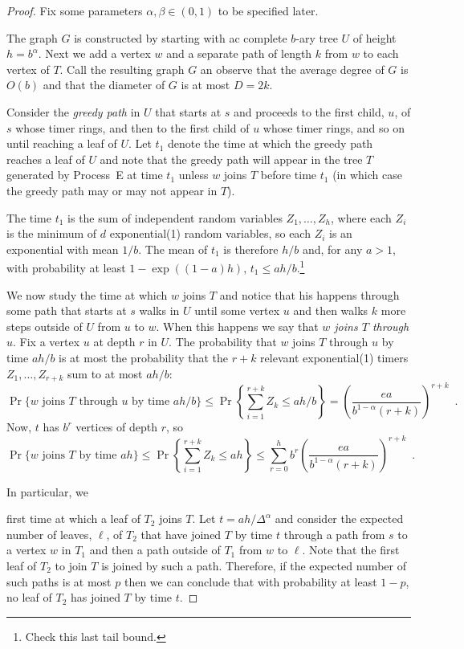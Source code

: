 \documentclass{patmorin}
\begin{document}
\begin{proof}
  Fix some parameters $\alpha,\beta\in (0,1)$ to be specified later.

  The graph $G$ is constructed by starting with ac complete $b$-ary
  tree $U$ of height $h=b^{\alpha}$.  Next we add a vertex $w$ and a
  separate path of length $k$ from $w$ to each vertex of $T$.  Call the
  resulting graph $G$ an observe that the average degree of $G$ is $O(b)$
  and that the diameter of $G$ is at most $D=2k$.

  Consider the \emph{greedy path} in $U$ that starts at $s$ and
  proceeds to the first child, $u$, of $s$ whose timer rings, and then
  to the first child of $u$ whose timer rings, and so on until reaching
  a leaf of $U$. Let $t_1$ denote the time at which the greedy path
  reaches a leaf of $U$ and note that the greedy path will appear in
  the tree $T$ generated by Process~E at time $t_1$ unless $w$ joins
  $T$ before time $t_1$ (in which case the greedy path may
  or may not appear in $T$).

  The time $t_1$ is the sum of independent random variables
  $Z_1,\ldots,Z_h$, where each $Z_i$ is the minimum of $d$ exponential(1)
  random variables, so each $Z_i$ is an exponential with mean $1/b$.  The
  mean of $t_1$ is therefore $h/b$ and, for any $a>1$, with probability
  at least $1-\exp((1-a)h)$,  $t_1\le ah/b$.\footnote{Check this last tail bound.}

  We now study the time at which $w$ joins $T$ and notice that his happens
  through some path that starts at $s$ walks in $U$ until some vertex $u$
  and then walks $k$ more steps outside of $U$ from $u$ to $w$.  When this
  happens we say that \emph{$w$ joins $T$ through $u$}.
  Fix a vertex $u$ at depth $r$ in $U$.  The probability that $w$ joins
  $T$ through $u$ by time $ah/b$ is at most the probability that the $r+k$
  relevant exponential(1) timers $Z_1,\ldots,Z_{r+k}$ sum to at most $ah/b$:
  \[
  \Pr\{\text{$w$ joins $T$ through $u$ by time $ah/b$}\} \le 
  \Pr\left\{\sum_{i=1}^{r+k} Z_k \le ah/b\right\} = \left(\frac{ea}{b^{1-\alpha}(r+k)}\right)^{r+k} \enspace .
  \]
  Now, $t$ has $b^r$ vertices of depth $r$, so 
  \[
   \Pr\{\text{$w$ joins $T$ by time $ah$}\} \le 
  \Pr\left\{\sum_{i=1}^{r+k} Z_k \le ah\right\} \le \sum_{r=0}^h b^r 
         \left(\frac{ea}{b^{1-\alpha}(r+k)}\right)^{r+k} \enspace .
  \]

In particular, we 


first time at which a leaf of $T_2$ joins $T$.
  Let $t=ah/\Delta^{\alpha}$ and consider the expected number of leaves, $\ell$,
  of $T_2$ that have joined $T$ by time $t$ through a path from $s$
  to a vertex $w$ in $T_1$ and then a path outside of $T_1$ from $w$
  to $\ell$.  Note that the first leaf of $T_2$ to join $T$ is joined
  by such a path.  Therefore, if the expected number of such paths is
  at most $p$ then we can conclude that with probability at least $1-p$,
  no leaf of $T_2$ has joined $T$ by time $t$.


\end{proof}
\end{document}
